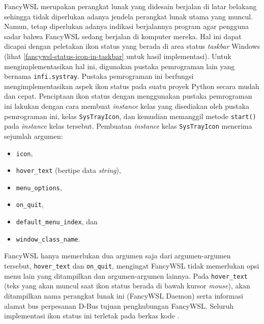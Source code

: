FancyWSL merupakan perangkat lunak yang didesain berjalan di latar belakang sehingga tidak diperlukan adanya jendela perangkat lunak utama yang muncul. Namun, tetap diperlukan adanya indikasi berjalannya program agar pengguna sadar bahwa FancyWSL sedang berjalan di komputer mereka. Hal ini dapat dicapai dengan peletakan ikon status yang berada di area status \textit{taskbar} Windows (lihat \autoref{fancywsl-status-icon-in-taskbar} untuk hasil implementasi). Untuk mengimplementasikan hal ini, digunakan pustaka pemrograman lain yang bernama \verb|infi.systray|. Pustaka pemrograman ini berfungsi mengimplementasikan aspek ikon status pada suatu proyek Python secara mudah dan cepat. Penciptaan ikon status dengan menggunakan pustaka pemrograman ini lakukan dengan cara membuat \textit{instance} kelas yang disediakan oleh pustaka pemrograman ini, kelas \verb|SysTrayIcon|, dan kemudian memanggil metode \verb|start()| pada \textit{instance} kelas tersebut. Pembuatan \textit{instance} kelas \verb|SysTrayIcon| menerima sejumlah argumen:
\begin{itemize}
    \item \verb|icon|,
    \item \verb|hover_text| (bertipe data \textit{string}),
    \item \verb|menu_options|,
    \item \verb|on_quit|,
    \item \verb|default_menu_index|, dan
    \item \verb|window_class_name|.
\end{itemize}
FancyWSL hanya memerlukan dua argumen saja dari argumen-argumen tersebut, \verb|hover_text| dan \verb|on_quit|, mengingat FancyWSL tidak memerlukan opsi menu lain yang ditampilkan dan argumen-argumen lainnya. Pada \verb|hover_text| (teks yang akan muncul saat ikon status berada di bawah kursor \textit{mouse}), akan ditampilkan nama perangkat lunak ini (FancyWSL Daemon) serta informasi alamat bus perpesanan D-Bus tujuan penghubungan FancyWSL. Seluruh implementasi ikon status ini terletak pada berkas kode .

